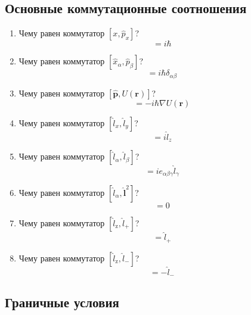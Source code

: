 \documentclass{article}
\begin{document}
\subsection*{Основные коммутационные соотношения}
\begin{enumerate}
	\item {Чему равен коммутатор $[x,\hat{p}_{x}]$?}
	\begin{equation}
		[x,\hat{p}_{x}]=i\hbar
	\end{equation}
	\item {Чему равен коммутатор $[\hat{x}_{\alpha},\hat{p}_{\beta}]$?}
	\begin{equation}
		[\hat{x}_{\alpha},\hat{p}_{\beta}]=i\hbar\delta_{\alpha\beta}
	\end{equation}
	\item {Чему равен коммутатор $[\hat{\boldsymbol{p}},U(\boldsymbol{r})]$?}
	\begin{equation}
		[\hat{\boldsymbol{p}},U(\boldsymbol{r})]=-i\hbar\nabla U(\boldsymbol{r})
	\end{equation}
	\item {Чему равен коммутатор $[\hat{l}_{x},\hat{l}_{y}]$?}
	\begin{equation}
		[\hat{l}_{x},\hat{l}_{y}]=i\hat{l}_{z}
	\end{equation}
	\item {Чему равен коммутатор $[\hat{l}_{\alpha},\hat{l}_{\beta}]$?}
	\begin{equation}
		[\hat{l}_{\alpha},\hat{l}_{\beta}]=ie_{\alpha\beta\gamma}\hat{l}_{\gamma}
	\end{equation}
	\item {Чему равен коммутатор $[\hat{l}_{\alpha},\hat{\boldsymbol{l}}^{2}]$?}
	\begin{equation}
		[\hat{l}_{\alpha},\hat{\boldsymbol{l}}^{2}]=0
	\end{equation}
	\item {Чему равен коммутатор $[\hat{l}_{\text{z}},\hat{l}_{+}]$?}
	\begin{equation}
		[\hat{l}_{\text{z}},\hat{l}_{+}]=\hat{l}_{+}
	\end{equation}
	\item {Чему равен коммутатор $[\hat{l}_{\text{z}},\hat{l}_{-}]$?}
	\begin{equation}
		[\hat{l}_{\text{z}},\hat{l}_{-}]=-\hat{l}_{-}
	\end{equation}
\end{enumerate}

\subsection*{Граничные условия}
\end{document}

